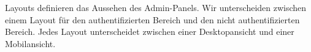 Layouts definieren das Aussehen des Admin-Panels.
Wir unterscheiden zwischen einem Layout für den authentifizierten Bereich und den nicht authentifizierten Bereich.
Jedes Layout unterscheidet zwischen einer Desktopansicht und einer Mobilansicht. 